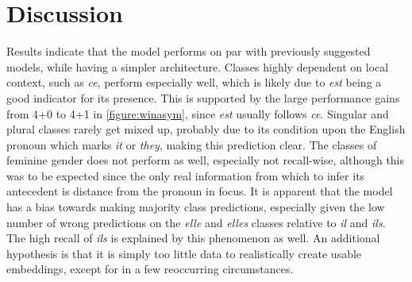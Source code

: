 \documentclass[11pt]{article}
\begin{document}
\begin{table}[t]
    \caption{Confusion matrix of class predictions. Row signifies actual class according to gold standard, while column represents predicted class according to the classifier.}
    \label{tbl:confmatrix}
\end{table}

\section{Discussion}

Results indicate that the model performs on par with previously suggested models, while having a simpler architecture.
Classes highly dependent on local context, such as \emph{ce}, perform especially well, which is likely due to \emph{est} being a good indicator for its presence.
This is supported by the large performance gains from 4+0 to 4+1 in \cref{figure:winasym}, since \emph{est} usually follows \emph{ce}.
Singular and plural classes rarely get mixed up, probably due to its condition upon the English pronoun which marks \emph{it} or \emph{they}, making this prediction clear.
The classes of feminine gender does not perform as well, especially not recall-wise, although this was to be expected since the only real information from which to infer its antecedent is distance from the pronoun in focus.
It is apparent that the model has a bias towards making majority class predictions, especially given the low number of wrong predictions on the \emph{elle} and \emph{elles} classes relative to \emph{il} and \emph{ils}.
The high recall of \emph{ils} is explained by this phenomenon as well.
An additional hypothesis is that it is simply too little data to realistically create usable embeddings, except for in a few reoccurring circumstances.
\end{document}

